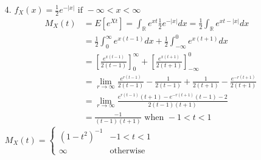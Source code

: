 \documentclass[11pt]{amsart}
\theoremstyle{definition}
\begin{document}
\begin{itemize}
\item[4.] $f_X(x)=\frac12e^{-|x|}\text{ if }-\infty<x<\infty$\\
\begin{align*}
    M_X(t)
    &=E[e^{Xt}]=\int_\mathbb{R}e^{xt}\frac12e^{-|x|}dx=\frac12\int_\mathbb{R}e^{xt-|x|}dx
    \\&=\frac12\int_0^\infty e^{x(t-1)}dx+\frac12\int_{-\infty}^0e^{x(t+1)}dx
    \\&=[\frac{e^{x(t-1)}}{2(t-1)}]_0^\infty+[\frac{e^{x(t+1)}}{2(t+1)}]_{-\infty}^0
    \\&=\lim_{r\to\infty}\frac{e^{r(t-1)}}{2(t-1)}-\frac1{2(t-1)}+\frac1{2(t+1)}-\frac{e^{-r(t+1)}}{2(t+1)}
    \\&=\lim_{r\to\infty}\frac{e^{r(t-1)}(t+1)-e^{-r(t+1)}(t-1)-2}{2(t-1)(t+1)}
    \\&=\frac{-1}{(t-1)(t+1)}\text{ when }-1<t<1
\end{align*}
$M_X(t)=\begin{cases}
    (1-t^2)^{-1} &-1<t<1 \\
    \infty &\text{otherwise}
\end{cases}$

\end{itemize}
\end{document}

